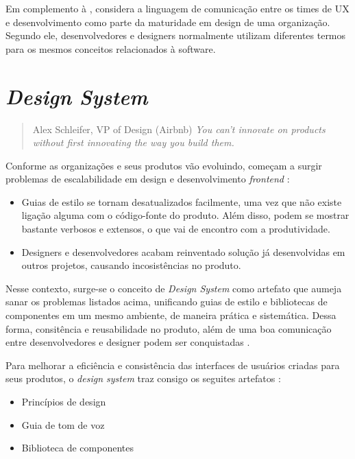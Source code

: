 Em complemento à \cite{nielsen1994usability}, \cite{curtis2010modular} considera a linguagem de comunicação entre os times de UX e desenvolvimento como parte da maturidade em design de uma organização. Segundo ele, desenvolvedores e designers normalmente utilizam diferentes termos para os mesmos conceitos relacionados à software.

\section{\textit{Design System}}
\label{sec:designSystem}

 \begin{quote}{Alex Schleifer, VP of Design (Airbnb)}
  \textit{You can’t innovate on products without first innovating the way you build them.}
 \end{quote}
 
Conforme as organizações e seus produtos vão evoluindo, começam a surgir problemas de escalabilidade em design e desenvolvimento \textit{frontend} \cite{curtis2010modular}:

\begin{itemize}
  \item Guias de estilo se tornam desatualizados facilmente, uma vez que não existe ligação alguma com o código-fonte do produto. Além disso, podem se mostrar bastante verbosos e extensos, o que vai de encontro com a produtividade.
  \item Designers e desenvolvedores acabam reinventado solução já desenvolvidas em outros projetos, causando incosistências no produto.
\end{itemize}

Nesse contexto, surge-se o conceito de \textit{Design System} como artefato que aumeja sanar os problemas listados acima, unificando guias de estilo e bibliotecas de componentes em um mesmo ambiente, de maneira prática e sistemática. Dessa forma, consitência e reusabilidade no produto, além de uma boa comunicação entre desenvolvedores e designer podem ser conquistadas \cite{curtis2010modular}.

Para melhorar a eficiência e consistência das interfaces de usuários criadas para seus produtos, o \textit{design system} traz consigo os seguites artefatos \cite{ruissalo2018operating}:

\begin{itemize}
  \item Princípios de design
  \item Guia de tom de voz
  \item Biblioteca de componentes
\end{itemize}


